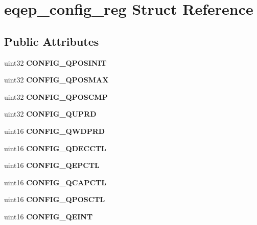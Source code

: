 \hypertarget{structeqep__config__reg}{}\section{eqep\+\_\+config\+\_\+reg Struct Reference}
\label{structeqep__config__reg}
\subsection*{Public Attributes}
\begin{DoxyCompactItemize}
\item 
\mbox{\label{structeqep__config__reg_aa856954f98ea73cd349c58c3b84a2a07}} 
uint32 {\bfseries C\+O\+N\+F\+I\+G\+\_\+\+Q\+P\+O\+S\+I\+N\+IT}
\item 
\mbox{\label{structeqep__config__reg_a23f9d189276bc5658cfa73daf2ba43fc}} 
uint32 {\bfseries C\+O\+N\+F\+I\+G\+\_\+\+Q\+P\+O\+S\+M\+AX}
\item 
\mbox{\label{structeqep__config__reg_a8b37c85e75d6849781375e12d2d040a3}} 
uint32 {\bfseries C\+O\+N\+F\+I\+G\+\_\+\+Q\+P\+O\+S\+C\+MP}
\item 
\mbox{\label{structeqep__config__reg_a87f3e6374ec9c6580a173ce8a99b6a0d}} 
uint32 {\bfseries C\+O\+N\+F\+I\+G\+\_\+\+Q\+U\+P\+RD}
\item 
\mbox{\label{structeqep__config__reg_a4fc04949d135a39495ac0807840935a8}} 
uint16 {\bfseries C\+O\+N\+F\+I\+G\+\_\+\+Q\+W\+D\+P\+RD}
\item 
\mbox{\label{structeqep__config__reg_a9600db799843f0f7a9df094b8bebe959}} 
uint16 {\bfseries C\+O\+N\+F\+I\+G\+\_\+\+Q\+D\+E\+C\+C\+TL}
\item 
\mbox{\label{structeqep__config__reg_a5493a4d8515241560dfb3fc3bfe1e725}} 
uint16 {\bfseries C\+O\+N\+F\+I\+G\+\_\+\+Q\+E\+P\+C\+TL}
\item 
\mbox{\label{structeqep__config__reg_a3078de1e1214daff30a10919236d8d22}} 
uint16 {\bfseries C\+O\+N\+F\+I\+G\+\_\+\+Q\+C\+A\+P\+C\+TL}
\item 
\mbox{\label{structeqep__config__reg_a87333c4b43c6576474e1b58f2b4035f5}} 
uint16 {\bfseries C\+O\+N\+F\+I\+G\+\_\+\+Q\+P\+O\+S\+C\+TL}
\item 
\mbox{\label{structeqep__config__reg_a310512211e29532acce14eb138492034}} 
uint16 {\bfseries C\+O\+N\+F\+I\+G\+\_\+\+Q\+E\+I\+NT}
\end{DoxyCompactItemize}


